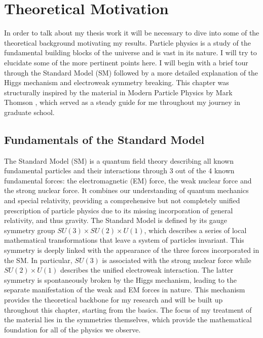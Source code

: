\chapter{Theoretical  Motivation}

In order to talk about my thesis work it will be necessary to dive into some of the theoretical
background motivating my results. Particle physics is a study of the fundamental building blocks
of the universe and is vast in its nature. I will try to elucidate some of the more pertinent points here. 
I will begin with a brief tour through the Standard Model (SM) followed by a more detailed explanation of
the Higgs mechanism and electroweak symmetry breaking. This chapter was structurally inspired by the 
material in Modern Particle Physics by Mark Thomson \cite{thomson-particle-physics}, which served as 
a steady guide for me throughout my journey in graduate school.

\section{Fundamentals of the Standard Model}

The Standard Model (SM) is a quantum field theory describing all known fundamental particles and 
their interactions through 3 out of the 4 known fundamental forces: the electromagnetic (EM) force, the 
weak nuclear force and the strong nuclear force. It combines our understanding of quantum mechanics and 
special relativity, providing a comprehensive but not completely unified prescription of particle physics 
due to its missing incorporation of general relativity, and thus gravity. The Standard Model 
is defined by its gauge symmetry group $SU(3)\times SU(2)\times U(1)$, which describes a series of local 
mathematical transformations that leave a system of particles invariant. This symmetry is deeply linked with the 
appearance of the three forces incorporated in the SM. In particular, $SU(3)$ is associated with the strong 
nuclear force while $SU(2)\times U(1)$ describes the unified electroweak interaction. The latter symmetry is 
spontaneously broken by the Higgs mechanism, leading to the separate manifestation of the weak and 
EM forces in nature. This mechanism provides the theoretical backbone for my research and will be built up 
throughout this chapter, starting from the basics. The focus of my treatment of the material lies in the symmetries 
themselves, which provide the mathematical foundation for all of the physics we observe.

